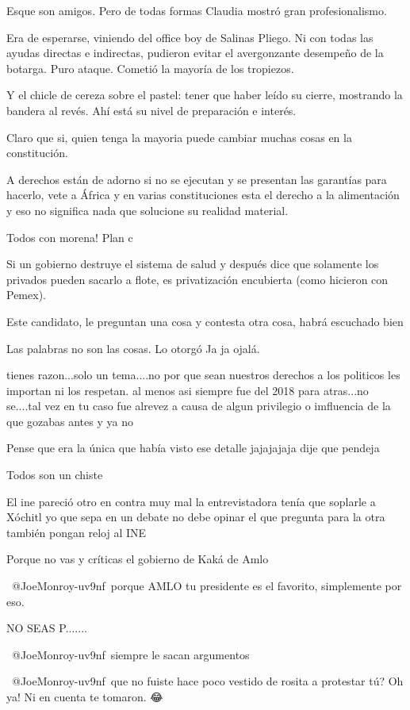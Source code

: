 Esque son amigos. Pero de todas formas Claudia mostró gran profesionalismo.

Era de esperarse, viniendo del office boy de Salinas Pliego.
Ni con todas las ayudas directas e indirectas, pudieron evitar el avergonzante desempeño de la botarga. Puro ataque. Cometió la mayoría de los tropiezos.

Y el chicle de cereza sobre el pastel: tener que haber leído su cierre, mostrando la bandera al revés. Ahí está su nivel de preparación e interés.

Claro que si, quien tenga la mayoria puede cambiar muchas cosas en la constitución.

A derechos están de adorno si no se ejecutan y se presentan las garantías para hacerlo, vete a África y en varias constituciones esta el derecho a la alimentación y eso no significa nada que solucione su realidad material.

Todos con morena! Plan c

Si un gobierno destruye el sistema de salud y después dice que solamente los privados pueden sacarlo a flote, es privatización encubierta (como hicieron con Pemex).

Este candidato, le preguntan una cosa y contesta otra cosa, habrá escuchado bien

Las palabras no son las cosas. Lo otorgó Ja ja ojalá.

tienes razon...solo un tema....no por que sean nuestros derechos a los politicos les importan ni los respetan. al menos asi siempre fue del 2018 para atras...no se....tal vez en tu caso fue alrevez a causa de algun privilegio o imfluencia de la que gozabas antes y ya no

Pense que era la única que había visto ese detalle jajajajaja dije que pendeja

Todos son un chiste

El ine pareció otro en contra muy mal la entrevistadora tenía que soplarle a Xóchitl yo que sepa en un debate no debe opinar el que pregunta para la otra también pongan reloj al  INE

Porque no vas y críticas el gobierno de Kaká de Amlo

​ @JoeMonroy-uv9nf porque AMLO tu presidente es el favorito, simplemente por eso.  🙈💃🏻💃🏻💁🏻‍♀️

NO SEAS P.......

 @JoeMonroy-uv9nf siempre le sacan argumentos 🫡

 @JoeMonroy-uv9nf que no fuiste hace poco vestido de rosita a protestar tú? Oh ya! Ni en cuenta te tomaron. 😂

